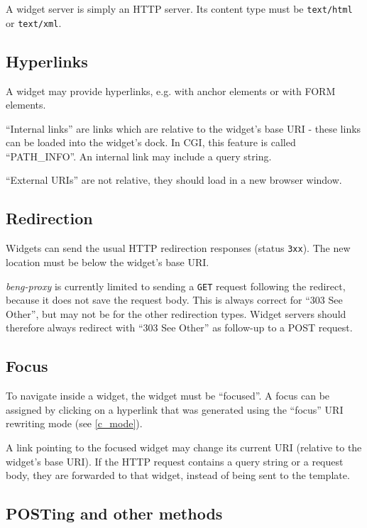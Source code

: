 \documentclass[a4paper,12pt]{article}
\begin{document}
A widget server is simply an HTTP server.  Its content type must be
\texttt{text/html} or \texttt{text/xml}.


\subsection{Hyperlinks}

A widget may provide hyperlinks, e.g. with anchor elements or with
FORM elements.

``Internal links'' are links which are relative to the widget's base
URI - these links can be loaded into the widget's dock.  In CGI, this
feature is called ``PATH\_INFO''.  An internal link may include a
query string.

``External URIs'' are not relative, they should
load in a new browser window.

\subsection{Redirection}

Widgets can send the usual HTTP redirection responses (status
\texttt{3xx}).  The new location must be below the widget's base URI.

\emph{beng-proxy} is currently limited to sending a \texttt{GET}
request following the redirect, because it does not save the request
body.  This is always correct for ``303 See Other'', but may not be
for the other redirection types.  Widget servers should therefore
always redirect with ``303 See Other'' as follow-up to a POST request.

\subsection{Focus}
\label{focus}

To navigate inside a widget, the widget must be ``focused''.  A focus
can be assigned by clicking on a hyperlink that was generated using
the ``focus'' URI rewriting mode (see \ref{c_mode}).

A link pointing to the focused widget may change its current URI
(relative to the widget's base URI).  If the HTTP request contains a
query string or a request body, they are forwarded to that widget,
instead of being sent to the template.

\subsection{POSTing and other methods}
\end{document}

